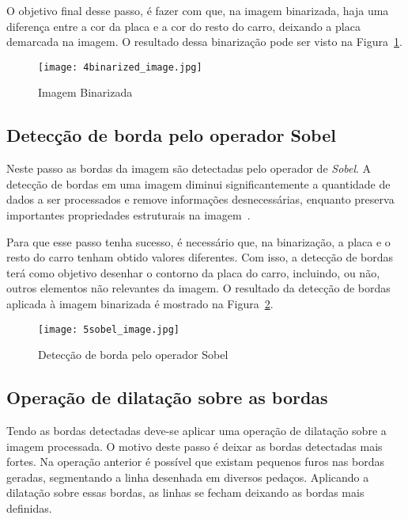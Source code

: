 O objetivo final desse passo, é fazer com que, na imagem binarizada, haja uma
diferença entre a cor da placa e a cor do resto do carro, deixando a placa
demarcada na imagem. O resultado dessa binarização pode ser visto na
Figura~\ref{fig:ext_binarized_image}.

\begin{figure}[H]
	\centering
	\texttt{[image: 4binarized\_image.jpg]}
	\caption{Imagem Binarizada}
	\label{fig:ext_binarized_image}
\end{figure}

\subsection{Detecção de borda pelo operador Sobel}
\label{sec:detec_bordas}

Neste passo as bordas da imagem são detectadas pelo operador de \emph{Sobel}. A
detecção de bordas em uma imagem diminui significantemente a quantidade de dados
a ser processados e remove informações desnecessárias, enquanto preserva
importantes propriedades estruturais na imagem~\cite{ha2016license}.

Para que esse passo tenha sucesso, é necessário que, na binarização, a placa e o
resto do carro tenham obtido valores diferentes. Com isso, a detecção de bordas
terá como objetivo desenhar o contorno da placa do carro, incluindo, ou não,
outros elementos não relevantes da imagem. O resultado da detecção de bordas
aplicada à imagem binarizada é mostrado na
Figura~\ref{fig:ext_edge_detection_sobel}.

\begin{figure}[H]
	\centering
	\texttt{[image: 5sobel\_image.jpg]}
	\caption{Detecção de borda pelo operador Sobel}
	\label{fig:ext_edge_detection_sobel}
\end{figure}

\subsection{Operação de dilatação sobre as bordas}

Tendo as bordas detectadas deve-se aplicar uma operação de dilatação sobre a
imagem processada. O motivo deste passo é deixar as bordas detectadas mais
fortes. Na operação anterior é possível que existam pequenos furos nas bordas
geradas, segmentando a linha desenhada em diversos pedaços. Aplicando a
dilatação sobre essas bordas, as linhas se fecham deixando as bordas mais
definidas.

